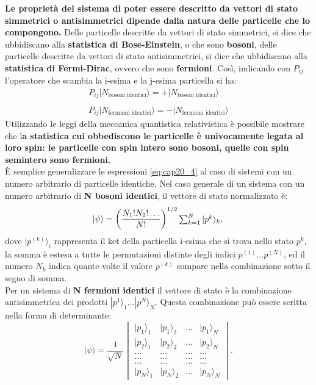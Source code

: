 \documentclass[a4paper,12pt,oneside]{book}
\begin{document}
\textbf{Le proprietà del sistema di poter essere descritto da vettori di stato simmetrici o antisimmetrici dipende dalla natura delle particelle che lo compongono.} Delle particelle descritte da vettori di stato simmetrici, si dice che ubbidiscano alla \textbf{statistica di Bose-Einstein}, o che sono \textbf{bosoni}, delle particelle descritte da vettori di stato antisimmetrici, si dice che ubbidiscano alla \textbf{statistica di Fermi-Dirac}, ovvero che sono \textbf{fermioni}. Così, indicando con $P_{ij}$ l'operatore che scambia la i-esima e la j-esima particella si ha:
\begin{eqnarray}
&P_{ij} |N_{\textrm{bosoni identici}}\rangle= +|N_{\textrm{bosoni identici}}\rangle & \nonumber \\
\\
&P_{ij} |N_{\textrm{fermioni identici}}\rangle= -|N_{\textrm{fermioni identici}}\rangle & \nonumber
\end{eqnarray}
Utilizzando le leggi della meccanica quantistica relativistica è possibile mostrare che l\textbf{a statistica cui obbediscono le particelle è univocamente legata al loro spin: le particelle con spin intero sono bosoni, quelle con spin semintero sono fermioni.}\\
È semplice generalizzare le espressioni \ref{eq:cap20_4} al caso di sistemi con un numero arbitrario di particelle identiche. Nel caso generale di un sistema con un numero arbitrario di \textbf{N bosoni identici}, il vettore di stato normalizzato è:\\
\begin{equation}
|\psi\rangle= \left(\frac{N_{1}! N_{2}!\dots}{N!}\right)^{1/2} \begin{matrix} \sum_{k=1}^N |p^k\rangle_{k} \end{matrix}, \\
\end{equation}
dove $|p^{(k)}\rangle_i$ rappresenta il ket della particella i-esima che si trova nello stato $p^k$, la somma \`e estesa a tutte le permutazioni distinte degli indici $p^{(1)}...p^{(N)}$, ed il numero $N_{k}$ indica quante volte il valore $p^{(k)}$ compare nella combinazione sotto il segno di somma.\\
Per un sistema di \textbf{N fermioni identici} il vettore di stato \`e la combinazione antisimmetrica dei prodotti $|p^1\rangle_1...|p^N\rangle_N$. Questa combinazione pu\`o essere scritta nella forma di determinante:\\
\begin{equation}
|\psi\rangle= \frac{1}{\sqrt{N}} \begin{vmatrix} |p_{1}\rangle_1 & |p_{1}\rangle_2 & ... & |p_{1}\rangle_N \\|p_{2}\rangle_1 & |p_{2}\rangle_2 & ... & |p_{2}\rangle_N \\ ... & ... & ... & ... \\ ... & ... & ... & ... \\ ... & ... & ... & ... \\|p_{N}\rangle_1 & |p_{N}\rangle_2 & ... & |p_{N}\rangle_N\end{vmatrix}.
\label{eq:cap20_5}
\end{equation}
\end{document}
